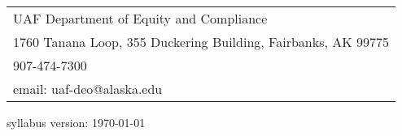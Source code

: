\documentclass[12pt]{article}
\begin{document}
\begin{tabular}{l}
UAF Department of Equity and Compliance\\
1760 Tanana Loop, 355 Duckering Building, Fairbanks, AK  99775\\
907-474-7300\\
email: {uaf-deo@alaska.edu}
\end{tabular}

\hfill

 \scriptsize syllabus version: \today \normalsize
\end{document}
